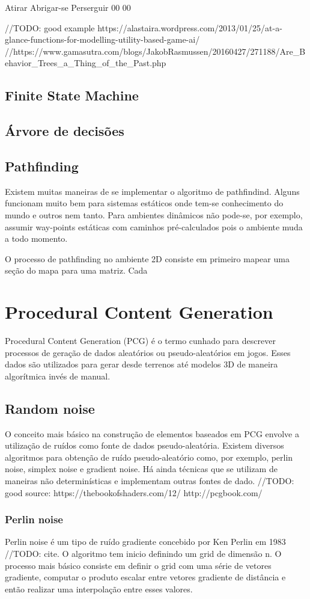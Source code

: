 \documentclass[12pt, 
openright, 
oneside, 
a4paper,    
brazil]{facom-ufu-abntex2}
\begin{document}
 Atirar		Abrigar-se		Perserguir
 00			00


//TODO: good example https://alastaira.wordpress.com/2013/01/25/at-a-glance-functions-for-modelling-utility-based-game-ai/
//https://www.gamasutra.com/blogs/JakobRasmussen/20160427/271188/Are_Behavior_Trees_a_Thing_of_the_Past.php

\section{Finite State Machine}
\section{Árvore de decisões}
\section{Pathfinding}
Existem muitas maneiras de se implementar o algoritmo de pathfindind. Alguns funcionam muito bem para sistemas estáticos onde tem-se conhecimento do mundo e outros nem tanto. Para ambientes dinâmicos não pode-se, por exemplo, assumir way-points estáticas com caminhos pré-calculados pois o ambiente muda a todo momento.

O processo de pathfinding no ambiente 2D consiste em primeiro mapear uma seção do mapa para uma matriz. Cada 

\chapter{Procedural Content Generation}
Procedural Content Generation (PCG) é o termo cunhado para descrever processos de geração de dados aleatórios ou pseudo-aleatórios em jogos. Esses dados são utilizados para gerar desde terrenos até modelos 3D de maneira algorítmica invés de manual.

\section{Random noise}
O conceito mais básico na construção de elementos baseados em PCG envolve a utilização de ruídos como fonte de dados pseudo-aleatória. Existem diversos algoritmos para obtenção de ruído pseudo-aleatório como, por exemplo, perlin noise, simplex noise e gradient noise. Há ainda técnicas que se utilizam de maneiras não determinísticas e implementam outras fontes de dado.
//TODO: good source: https://thebookofshaders.com/12/ http://pcgbook.com/

\subsection{Perlin noise}
Perlin noise é um tipo de ruído gradiente concebido por Ken Perlin em 1983 //TODO: cite. O algoritmo tem inicio definindo um grid de dimensão n. O processo mais básico consiste em definir o grid com uma série de vetores gradiente, computar o produto escalar entre vetores gradiente de distância e então realizar uma interpolação entre esses valores.
\end{document}

